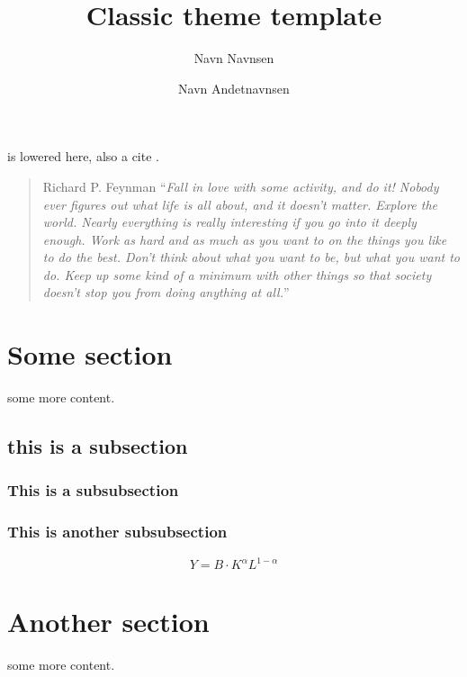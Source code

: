 \documentclass{01_preamble/classicreport}
\title{Classic theme template}
\author[a]{Navn Navnsen}
\author[b]{Navn Andetnavnsen}
\affil[a]{navn@navnsen.com}
\affil[b]{navn@andetnavnsen.com}
\begin{document}
\maketitle
\vskip24pt
\begin{abstract}
\noindent
\blindtext
\end{abstract}
\vskip24pt


 is lowered here, also a cite \citep{christensen_assessing_2015}.
\blindtext[4]
\begin{quote}{Richard P. Feynman}
    \enquote{\textit{Fall in love with some activity, and do it! Nobody ever figures out what life is all about, and it doesn't matter. Explore the world. Nearly everything is really interesting if you go into it deeply enough. Work as hard and as much as you want to on the things you like to do the best. Don't think about what you want to be, but what you want to do. Keep up some kind of a minimum with other things so that society doesn't stop you from doing anything at all.}}
\end{quote}

\noindent\blindtext[2]
\section{Some section}
 some more content.
\blindtext 
\citep{alyass_big_2015}

\subsection{this is a subsection}
\blindtext[2]
\subsubsection{This is a subsubsection}
\blindtext
\subsubsection{This is another subsubsection}
\blindtext
\begin{equation}
    Y = B\cdot K^\alpha L^{1-\alpha}
\end{equation}


\section{Another section}
 some more content.
\blindtext[2]
\end{document}
